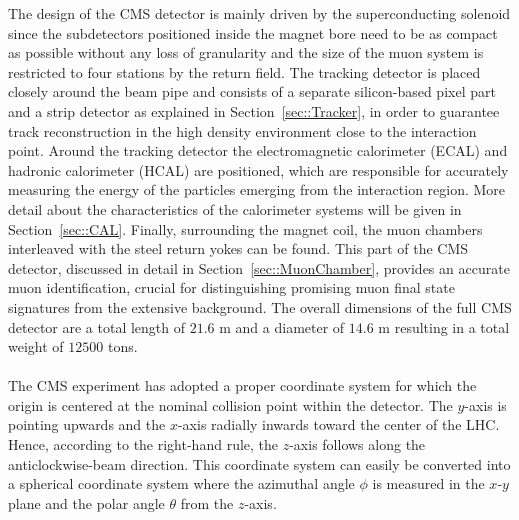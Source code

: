 The design of the CMS detector is mainly driven by the superconducting solenoid since the subdetectors positioned inside the magnet bore need to be as compact as possible without any loss of granularity and the size of the muon system is restricted to four stations by the return field. 
The tracking detector is placed closely around the beam pipe and consists of a separate silicon-based pixel part and a strip detector as explained in Section~\ref{sec::Tracker}, in order to guarantee track reconstruction in the high density environment close to the interaction point.
Around the tracking detector the electromagnetic calorimeter (ECAL) and hadronic calorimeter (HCAL) are positioned, which are responsible for accurately measuring the energy of the particles emerging from the interaction region. More detail about the characteristics of the calorimeter systems will be given in Section~\ref{sec::CAL}. Finally, surrounding the magnet coil, the muon chambers interleaved with the steel return yokes can be found. This part of the CMS detector, discussed in detail in Section~\ref{sec::MuonChamber}, provides an accurate muon identification, crucial for distinguishing promising muon final state signatures from the extensive background. 
The overall dimensions of the full CMS detector are a total length of $21.6$ m and a diameter of $14.6$ m resulting in a total weight of $12500$ tons.
\\
\\
The CMS experiment has adopted a proper coordinate system for which the origin is centered at the nominal collision point within the detector. The $y$-axis is pointing upwards and the $x$-axis radially inwards toward the center of the LHC. Hence, according to the right-hand rule, the $z$-axis follows along the anticlockwise-beam direction. This coordinate system can easily be converted into a spherical coordinate system where the azimuthal angle $\phi$ is measured in the $x$-$y$ plane and the polar angle $\theta$ from the $z$-axis. 
